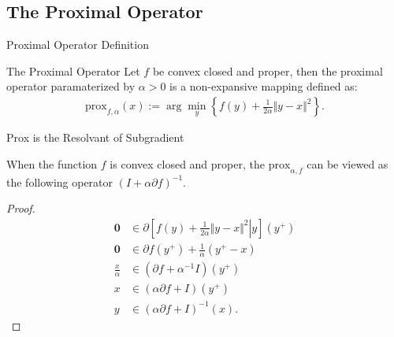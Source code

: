 \documentclass[11pt]{beamer}
\begin{document}
    \subsection{The Proximal Operator}
        \begin{frame}{Proximal Operator Definition}
            \begin{definition}{The Proximal Operator}
                Let $f$ be convex closed and proper, then the proximal operator paramaterized by $\alpha > 0$ is a non-expansive mapping defined as: 
                \begin{align*}
                    \text{prox}_{f, \alpha}(x) := 
                    \arg\min_{y}\left\lbrace
                        f(y) + \frac{1}{2\alpha} \Vert y - x\Vert^2
                    \right\rbrace. 
                \end{align*}
            \end{definition}  
        \end{frame}
        \begin{frame}{Prox is the Resolvant of Subgradient}
            \begin{lemma}\label{lemma:prox_alternative_form}
                When the function $f$ is convex closed and proper, the $\text{prox}_{\alpha, f}$ can be viewed as the following operator $(I + \alpha \partial f)^{-1}$. 
            \end{lemma}
            \begin{proof}
                {\scriptsize
                \begin{align*}
                    \mathbf 0 &\in \partial
                    \left[
                        \left.
                            f(y) + \frac{1}{2\alpha} \Vert y - x\Vert^2 
                        \right| y
                    \right](y^+)
                    \\
                    \mathbf 0 &\in \partial f(y^+) + \frac{1}{\alpha}(y^+ - x)
                    \\
                    \frac{x}{\alpha} &\in 
                    (\partial f + \alpha^{-1}I)(y^+)
                    \\
                    x &\in 
                    (\alpha \partial f + I)(y^+)
                    \\
                    y &\in (\alpha\partial f+ I)^{-1}(x).
                \end{align*}
                }
            \end{proof}
                
        \end{frame}
\end{document}
